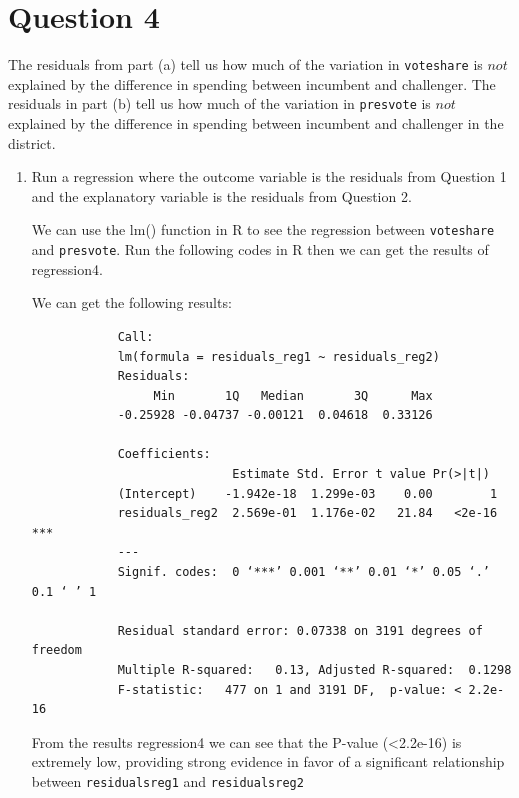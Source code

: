 \documentclass[12pt,letterpaper]{article}
\begin{document}
	\newpage
\section*{Question 4}
\noindent The residuals from part (a) tell us how much of the variation in \texttt{voteshare} is $not$ explained by the difference in spending between incumbent and challenger. The residuals in part (b) tell us how much of the variation in \texttt{presvote} is $not$ explained by the difference in spending between incumbent and challenger in the district.
	\begin{enumerate}
		\item Run a regression where the outcome variable is the residuals from Question 1 and the explanatory variable is the residuals from Question 2.	\vspace{.16cm}
		
		 \noindent  We can use the lm() function in R to see the regression between \texttt{voteshare} and \texttt{presvote}. Run the following codes in R then we can get the results of regression4.	\vspace{.15cm}
		
		
		
		\noindent We can get the following results: \vspace{.15cm}
		\begin{verbatim}
			Call:
			lm(formula = residuals_reg1 ~ residuals_reg2)
			Residuals:
			     Min       1Q   Median       3Q      Max 
			-0.25928 -0.04737 -0.00121  0.04618  0.33126 
			
			Coefficients: 
			                Estimate Std. Error t value Pr(>|t|)    
			(Intercept)    -1.942e-18  1.299e-03    0.00        1    
			residuals_reg2  2.569e-01  1.176e-02   21.84   <2e-16 ***
			---
			Signif. codes:  0 ‘***’ 0.001 ‘**’ 0.01 ‘*’ 0.05 ‘.’ 0.1 ‘ ’ 1
			
			Residual standard error: 0.07338 on 3191 degrees of freedom
			Multiple R-squared:   0.13,	Adjusted R-squared:  0.1298 
			F-statistic:   477 on 1 and 3191 DF,  p-value: < 2.2e-16
		\end{verbatim}
		\vspace{.15cm}
		
		\noindent From the results regression4 we can see that the P-value (\textless 2.2e-16) is extremely low, providing strong evidence in favor of a significant relationship between \texttt{residuals\textunderscore{}reg1} and \texttt{residuals\textunderscore{}reg2}\\ \vspace{.15cm}
		

\end{enumerate}
\end{document}
